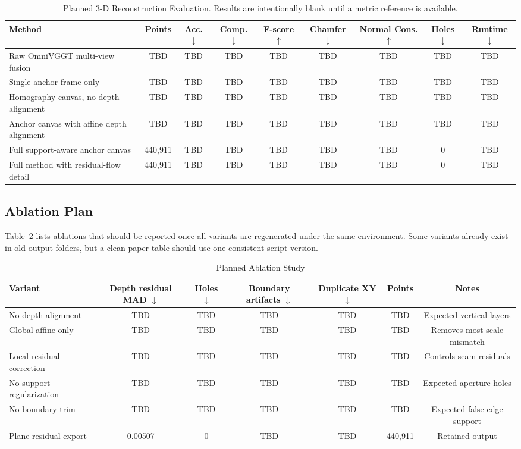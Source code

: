 \documentclass[conference]{IEEEtran}
\newcommand{\TBD}{\textsc{TBD}}
\begin{document}
\begin{table}[t]
\centering
\caption{Planned 3-D Reconstruction Evaluation. Results are intentionally blank until a metric reference is available.}
\label{tab:future_3d_metrics}
\begin{tabular}{lcccccccc}
\toprule
Method & Points & Acc. $\downarrow$ & Comp. $\downarrow$ & F-score $\uparrow$ & Chamfer $\downarrow$ & Normal Cons. $\uparrow$ & Holes $\downarrow$ & Runtime $\downarrow$ \\
\midrule
Raw OmniVGGT multi-view fusion & \TBD & \TBD & \TBD & \TBD & \TBD & \TBD & \TBD & \TBD \\
Single anchor frame only & \TBD & \TBD & \TBD & \TBD & \TBD & \TBD & \TBD & \TBD \\
Homography canvas, no depth alignment & \TBD & \TBD & \TBD & \TBD & \TBD & \TBD & \TBD & \TBD \\
Anchor canvas with affine depth alignment & \TBD & \TBD & \TBD & \TBD & \TBD & \TBD & \TBD & \TBD \\
Full support-aware anchor canvas & 440,911 & \TBD & \TBD & \TBD & \TBD & \TBD & 0 & \TBD \\
Full method with residual-flow detail & 440,911 & \TBD & \TBD & \TBD & \TBD & \TBD & 0 & \TBD \\
\bottomrule
\end{tabular}
\end{table}

\subsection{Ablation Plan}
Table~\ref{tab:ablation_plan} lists ablations that should be reported once all variants are regenerated under the same environment. Some variants already exist in old output folders, but a clean paper table should use one consistent script version.

\begin{table}[t]
\centering
\caption{Planned Ablation Study}
\label{tab:ablation_plan}
\begin{tabular}{lcccccc}
\toprule
Variant & Depth residual MAD $\downarrow$ & Holes $\downarrow$ & Boundary artifacts $\downarrow$ & Duplicate XY $\downarrow$ & Points & Notes \\
\midrule
No depth alignment & \TBD & \TBD & \TBD & \TBD & \TBD & Expected vertical layers \\
Global affine only & \TBD & \TBD & \TBD & \TBD & \TBD & Removes most scale mismatch \\
Local residual correction & \TBD & \TBD & \TBD & \TBD & \TBD & Controls seam residuals \\
No support regularization & \TBD & \TBD & \TBD & \TBD & \TBD & Expected aperture holes \\
No boundary trim & \TBD & \TBD & \TBD & \TBD & \TBD & Expected false edge support \\
Plane residual export & 0.00507 & 0 & \TBD & \TBD & 440,911 & Retained output \\
\bottomrule
\end{tabular}
\end{table}
\end{document}
